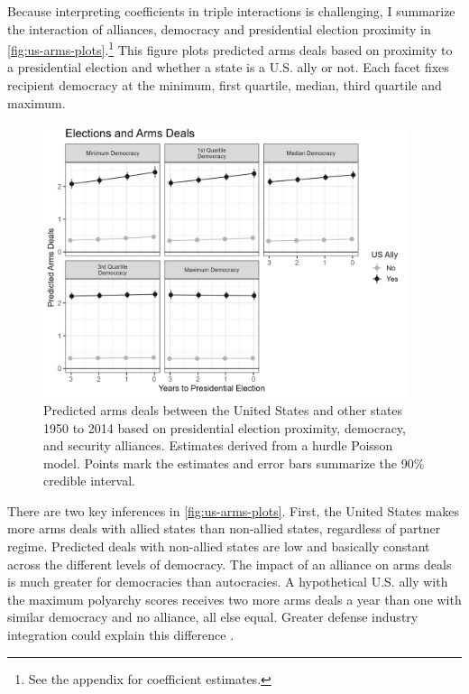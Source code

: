 \documentclass[12pt]{article}
\begin{document}
Because interpreting coefficients in triple interactions is challenging, I summarize the interaction of alliances, democracy and presidential election proximity in \autoref{fig:us-arms-plots}.\footnote{See the appendix for coefficient estimates.}
This figure plots predicted arms deals based on proximity to a presidential election and whether a state is a U.S. ally or not. 
Each facet fixes recipient democracy at the minimum, first quartile, median, third quartile and maximum.


\begin{figure}[htpb]
	\centering
		\includegraphics[width=0.95\textwidth]{../figures/us-arms-plots.png}
	\caption{Predicted arms deals between the United States and other states 1950 to 2014 based on presidential election proximity, democracy, and security alliances. Estimates derived from a hurdle Poisson model. Points mark the estimates and error bars summarize the 90\% credible interval.}
	\label{fig:us-arms-plots}
\end{figure}


There are two key inferences in \autoref{fig:us-arms-plots}.
First, the United States makes more arms deals with allied states than non-allied states, regardless of partner regime. 
Predicted deals with non-allied states are low and basically constant across the different levels of democracy. 
The impact of an alliance on arms deals is much greater for democracies than autocracies.
A hypothetical U.S. ally with the maximum polyarchy scores receives two more arms deals a year than one with similar democracy and no alliance, all else equal. 
Greater defense industry integration could explain this difference \citep{Brooks2005}.
\end{document}
